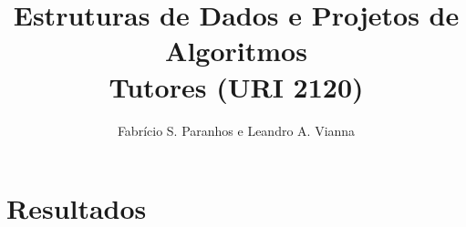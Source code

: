 \documentclass[12pt]{article}
\title{Estruturas de Dados e Projetos de Algoritmos\\Tutores (URI 2120)}
\author{Fabrício S. Paranhos\inst{1} e Leandro A. Vianna\inst{1}}
\begin{document}
 

\maketitle

     


\section{Resultados} \label{sec:res}
% 







\end{document}
